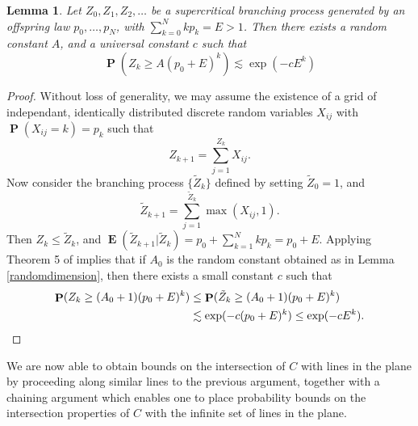 \documentclass[dvipsnames,letterpaper,12pt]{article}
\numberwithin{equation}{section}
\theoremstyle{plain}
\newtheorem{lemma}{Lemma}
\DeclareMathOperator{\Prob}{\mathbf{P}}
\DeclareMathOperator{\Expect}{\mathbf{E}}
\begin{document}
\begin{lemma}\label{branchingtrick}
	Let $Z_0, Z_1, Z_2, \dots$ be a supercritical branching process generated by an offspring law $p_0, \dots, p_N$, with $\sum_{k = 0}^N k p_k = E > 1$. Then there exists a random constant $A$, and a universal constant $c$ such that
	\[ \Prob(Z_k \geq A (p_0 + E)^k) \lesssim \exp(-c E^k) \]
\end{lemma}
\begin{proof}
	Without loss of generality, we may assume the existence of a grid of independant, identically distributed discrete random variables $X_{ij}$ with $\Prob(X_{ij} = k) = p_k$ such that
	\[ Z_{k+1} = \sum_{j = 1}^{Z_k} X_{ij}. \]
	Now consider the branching process $\{ \tilde{Z}_k \}$ defined by setting $\tilde{Z}_0 = 1$, and
	\[ \tilde{Z}_{k+1} = \sum_{j = 1}^{\tilde{Z}_k} \max(X_{ij}, 1). \]
	Then $Z_k \leq \tilde{Z}_k$, and $\Expect(\tilde{Z}_{k+1}|\tilde{Z}_k) = p_0 + \sum_{k = 1}^N k p_k = p_0 + E$. Applying Theorem 5 of \cite{Athreya} implies that if $A_0$ is the random constant obtained as in Lemma \ref{randomdimension}, then there exists a small constant $c$ such that
	\begin{align*}
		\Prob(Z_k \geq (A_0+1) (p_0 + E)^k) &\leq \Prob(\tilde{Z}_k \geq (A_0+1) (p_0 + E)^k)\\
		&\lesssim \exp(-c (p_0 + E)^k ) \leq \exp(-c E^k). \qedhere
	\end{align*}
\end{proof}

We are now able to obtain bounds on the intersection of $C$ with lines in the plane by proceeding along similar lines to the previous argument, together with a chaining argument which enables one to place probability bounds on the intersection properties of $C$ with the infinite set of lines in the plane.
\end{document}
